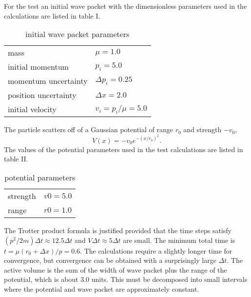 \documentclass[aps,prc,reprint,noshowpacs,groupedaddress,onecolumn]{revtex4}
\def\beq{\begin{equation}}
\def\eeq{\end{equation}}
\begin{document}
For the test an initial wave packet with the dimensionless
parameters used in the calculations are listed in table I.
\begin{table}
\caption{initial wave packet parameters}
\begin{tabular}{ll}
\hline
\hline
mass &$\mu = 1.0$\\
initial momentum &$p_i=   5.0$\\ 
momentum uncertainty &$\Delta p_i =0.25$\\ 
position uncertainty &$\Delta x= 2.0$\\
initial velocity &$v_i=p_i/\mu = 5.0$\\
\hline
\end{tabular}
\end{table}
The particle scatters off of a Gaussian potential of range $r_0$ and strength
$-v_0$,
\beq
V(x) = -v_0 e^{-(x/r_0)^2}.
\label{cc.1}
\eeq
The values of the potential parameters used in the test
calculations are listed in table II.
\begin{table}
\caption{potential parameters}
\begin{tabular}{ll}
\hline
\hline 
strength &$ v0=5.0$\\ 
range &$r0=1.0$\\
\hline
\end{tabular}
\end{table}

The Trotter product formula is justified provided that the time steps
satisfy $(p^2/2m) \Delta t \approx 12.5 \Delta t$ and
$V \Delta t \approx 5 \Delta t$ are small.  The minimum total time is
$t= \mu (r_0+\Delta x)/p = 0.6$.  The calculations require a slightly
longer time for convergence, but convergence can be obtained with a
surprisingly large $\Delta t$.  The active volume is the sum of the
width of wave packet plus the range of the potential, which is about
$3.0$ units.  This must be decomposed into small intervals where the
potential and wave packet are approximately constant.
\end{document}
